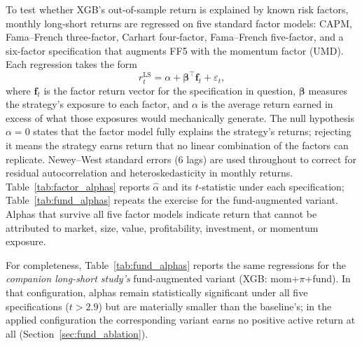 To test whether XGB's out-of-sample return is explained by known risk factors, monthly long-short returns are regressed on five standard factor models: CAPM, Fama--French three-factor, Carhart four-factor, Fama--French five-factor, and a six-factor specification that augments FF5 with the momentum factor (UMD). Each regression takes the form
\begin{equation}
r_t^{\text{LS}} = \alpha + \boldsymbol{\beta}^\top \mathbf{f}_t + \varepsilon_t,
\label{eq:factor_regression}
\end{equation}
where $\mathbf{f}_t$ is the factor return vector for the specification in question, $\boldsymbol{\beta}$ measures the strategy's exposure to each factor, and $\alpha$ is the average return earned in excess of what those exposures would mechanically generate. The null hypothesis $\alpha = 0$ states that the factor model fully explains the strategy's returns; rejecting it means the strategy earns return that no linear combination of the factors can replicate. Newey--West standard errors (6 lags) are used throughout to correct for residual autocorrelation and heteroskedasticity in monthly returns. Table~\ref{tab:factor_alphas} reports $\hat\alpha$ and its $t$-statistic under each specification; Table~\ref{tab:fund_alphas} repeats the exercise for the fund-augmented variant. Alphas that survive all five factor models indicate return that cannot be attributed to market, size, value, profitability, investment, or momentum exposure.



For completeness, Table~\ref{tab:fund_alphas} reports the same regressions for the \emph{companion long-short study's} fund-augmented variant (XGB: mom+$\pi$+fund). In that configuration, alphas remain statistically significant under all five specifications ($t > 2.9$) but are materially smaller than the baseline's; in the applied configuration the corresponding variant earns no positive active return at all (Section~\ref{sec:fund_ablation}).




